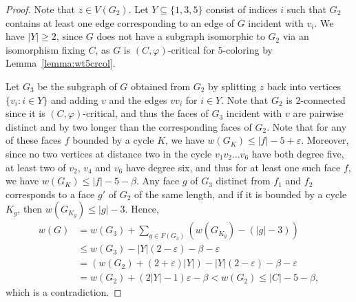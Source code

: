 \documentclass[12pt,twoside,openright,a4paper]{book}
\begin{document}
\begin{proof}
Note that $z\in V(G_2)$.  Let $Y\subseteq\{1,3,5\}$ consist of indices $i$ such that $G_2$ contains at least one edge corresponding
to an edge of $G$ incident with $v_i$.  We have $|Y|\ge 2$, since $G$ does not have a subgraph isomorphic to $G_2$
via an isomorphism fixing $C$, as $G$ is $(C,\varphi)$-critical for $5$-coloring by Lemma~\ref{lemma:wt5crcol}.

Let $G_3$ be the subgraph of $G$ obtained from $G_2$ by splitting $z$ back into vertices $\{v_i:i\in Y\}$ and adding $v$ and the edges $vv_i$ for $i\in Y$.
Note that $G_2$ is $2$-connected since it is $(C,\varphi)$-critical, and thus the faces of $G_3$ incident with $v$ are
pairwise distinct and by two longer than the corresponding faces of $G_2$.
Note that for any of these faces $f$ bounded by a cycle $K$, we have $w(G_K)\le |f|-5+\varepsilon$.
Moreover, since no two vertices at distance two in the cycle $v_1v_2\ldots v_6$ have both degree five,
at least two of $v_2$, $v_4$ and $v_6$ have degree six, and thus for at least one such face $f$, we
have $w(G_K)\le |f|-5-\beta$.  Any face $g$ of $G_3$ distinct from $f_1$ and $f_2$
corresponds to a face $g'$ of $G_2$ of the same length, and if it is bounded by a cycle $K_g$, then $w(G_{K_g})\le |g|-3$.
Hence,
\begin{align*}
w(G)&=w(G_3)+\sum_{g\in F(G_3)} (w(G_{K_g})-(|g|-3))\\
&\le w(G_3)-|Y|(2-\varepsilon)-\beta-\varepsilon\\
&=(w(G_2)+(2+\varepsilon)|Y|)-|Y|(2-\varepsilon)-\beta-\varepsilon\\
&=w(G_2)+(2|Y|-1)\varepsilon-\beta<w(G_2)\le |C|-5-\beta,
\end{align*}
which is a contradiction.
\end{proof}
\end{document}
